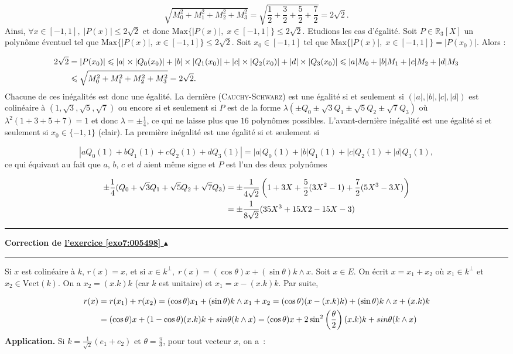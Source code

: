 \documentclass[11pt,a4paper]{article}
\newcommand{\Rr}{\mathbb{R}} \newcommand{\R}{\mathbb{R}}
\newcounter{exo}
\newcommand{\correction}[1]{\hypertarget{cor7:#1}{}\label{cor7:#1}{\bf Correction de \hyperlink{exo7:#1}{l'exercice \ref{exo7:#1} $\blacktriangle$}}\vspace{1mm}\hrule\vspace{1mm}}
\newcommand{\fincorrection}{\vspace{1mm}\hrule\vspace*{7mm}}
\begin{document}
$$\sqrt{M_0^2+M_1^2+M_2^2+M_3^2}=\sqrt{\frac{1}{2}+\frac{3}{2}+\frac{5}{2}+\frac{7}{2}}=2\sqrt{2}.$$
Ainsi, $\forall x\in[-1,1],\;|P(x)|\leq2\sqrt{2}$ et donc $\mbox{Max}\{|P(x)|,\;x\in[-1,1]\}\leq2\sqrt{2}$.
Etudions les cas d'égalité. Soit $P\in\Rr_3[X]$ un polynôme éventuel tel que $\mbox{Max}\{|P(x)|,\;x\in[-1,1]\}\leq2\sqrt{2}$.
Soit $x_0\in[-1,1]$ tel que $\mbox{Max}\{|P(x)|,\;x\in[-1,1]\}=|P(x_0)|$. Alors :

\begin{align*}\ensuremath
2\sqrt{2}&=|P(x_0)|\leq|a|\times|Q_0(x_0)|+|b|\times|Q_1(x_0)|+|c|\times|Q_2(x_0)|+|d|\times|Q_3(x_0)|\leq|a|M_0+|b|M_1+|c|M_2+|d|M_3\\
 &\leq\sqrt{M_0^2+M_1^2+M_2^2+M_3^2}=2\sqrt{2}.
\end{align*}
Chacune de ces inégalités est donc une égalité. La dernière (\textsc{Cauchy}-\textsc{Schwarz}) est une égalité si et seulement si $(|a|,|b|,|c|,|d|)$ est colinéaire à $(1,\sqrt{3},\sqrt{5},\sqrt{7})$ ou encore si et seulement si $P$ est de la forme $\lambda(\pm Q_0\pm\sqrt{3}Q_1\pm\sqrt{5}Q_2\pm\sqrt{7}Q_3)$ où $\lambda^2(1+3+5+7)=1$ et donc $\lambda=\pm\frac{1}{4}$, ce qui ne laisse plus que $16$ polynômes possibles. L'avant-dernière inégalité est une égalité si et seulement si $x_0\in\{-1,1\}$ (clair). La première inégalité est une égalité si et seulement si 

$$|aQ_0(1)+bQ_1(1)+cQ_2(1)+dQ_3(1)|=|a|Q_0(1)+|b|Q_1(1)+|c|Q_2(1)+|d|Q_3(1),$$
ce qui équivaut au fait que $a$, $b$, $c$ et $d$ aient même signe et $P$ est l'un des deux polynômes
 
\begin{align*}\ensuremath
\pm\frac{1}{4}(Q_0+\sqrt{3}Q_1+\sqrt{5}Q_2+\sqrt{7}Q_3)&=\pm\frac{1}{4\sqrt{2}}\left(1+3X+\frac{5}{2}(3X^2-1)
+\frac{7}{2}(5X^3-3X)\right)\\
 &=\pm\frac{1}{8\sqrt{2}}(35X^3+15X2-15X-3)
\end{align*}
\fincorrection
\correction{005498}
Si $x$ est colinéaire à $k$, $r(x)=x$, et si $x\in k^\bot,\;r(x)=(\cos\theta)x+(\sin\theta)k\wedge x$.
Soit $x\in E$. On écrit $x=x_1+x_2$ où $x_1\in k^\bot$ et $x_2\in\mbox{Vect}(k)$. On a $x_2=(x.k)k$ (car $k$ est unitaire) et $x_1=x-(x.k)k$. Par suite,

\begin{align*}\ensuremath
r(x)&=r(x_1)+r(x_2)=(\cos\theta)x_1+(\sin\theta)k\wedge x_1+x_2=(\cos\theta)(x-(x.k)k)+(\sin\theta)k\wedge x+(x.k)k\\
 &=(\cos\theta)x+(1-\cos\theta)(x.k)k+sin\theta(k\wedge x)=(\cos\theta)x+2\sin^2\left(\frac{\theta}{2}\right)(x.k)k+sin\theta(k\wedge x)
\end{align*}
\textbf{Application.} Si $k=\frac{1}{\sqrt{2}}(e_1+e_2)$ et $\theta=\frac{\pi}{3}$, pour tout vecteur $x$, on a~:
\end{document}
